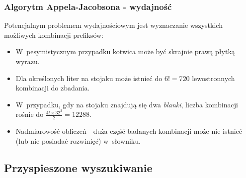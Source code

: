 \documentclass[10pt,a4paper]{beamer}
\begin{document}
\begin{frame}
	\frametitle{Algorytm Appela-Jacobsona - wydajność}
	
	Potencjalnym problemem wydajnościowym jest wyznaczanie wszystkich możliwych kombinacji prefiksów:
	
	\begin{itemize}
		\item W~pesymistycznym przypadku kotwica może być skrajnie prawą płytką wyrazu.
		\item Dla określonych liter na stojaku może istnieć do $6! = 720$ lewostronnych kombinacji do zbadania.
		\item W~przypadku, gdy na stojaku znajdują się dwa \emph{blanki}, liczba kombinacji rośnie do $\frac{4! \times 32^{2}}{2} = 12288$.
		\item Nadmiarowość obliczeń - duża część badanych kombinacji może nie istnieć (lub nie posiadać rozwinięć) w~słowniku. 
	\end{itemize}

\end{frame}

\subsection{Przyspieszone wyszukiwanie}
\end{document}
